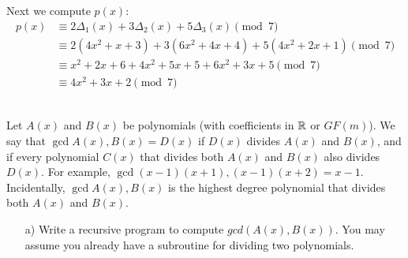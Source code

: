 \documentclass[]{article}
\newif\ifsolutions
\renewcommand{\answer}[1]{{\color{mydarkblue}\textbf{Solution:}#1}}
\begin{document}
\begin{qunlist}
\begin{itemize}
{{Next we compute $p(x)$:
\begin{align*}
p(x) &\equiv 2 \Delta_1(x) + 3 \Delta_2(x) + 5 \Delta_3(x)  \pmod 7\\
&\equiv 2(4x^2+x+3)+3(6x^2+4x+4)+5(4x^2+2x+1)\pmod 7\\
&\equiv x^2+2x+6+4x^2+5x+5+6x^2+3x+5 \pmod 7\\
&\equiv 4x^2+3x+2 \pmod 7
\end{align*}


}}\fi

\end{itemize}





 \\   %
Let $A(x)$ and $B(x)$ be polynomials (with coefficients in $\mathbb{R}$ or $GF(m)$). We say that  $\gcd{A(x), B(x)} = D(x)$ if $D(x)$ divides $A(x)$ and $B(x)$, and if every polynomial $C(x)$ that divides both $A(x)$ and $B(x)$ also divides $D(x)$. For example, $\gcd{(x-1)(x+1), (x-1)(x+2)} = x-1$. Incidentally, $\gcd{A(x), B(x)}$ is the highest degree polynomial that divides both $A(x)$ and $B(x)$.

\begin{itemize}
\qpart
\item[a)] Write a recursive program to compute $gcd(A(x),B(x))$. 
You may assume you already have a subroutine for dividing two polynomials. 


\ifsolutions{\answer{
Consider the following recursive definition $F$:
\begin{itemize}
\item $F(A(x), 0) = A(x)$.
\item If $A(x) = B(x) Q(x) + R(x)$ with $\deg{R(x)} < \deg{B(x)}$, then
\[
F(A(x), B(x)) = F(B(x), R(x)).
\] 
($\deg{P(x)}$ denotes the degree of $P(x)$.) 
\end{itemize}
}}\fi


\end{itemize}
\end{qunlist}
\end{document}
